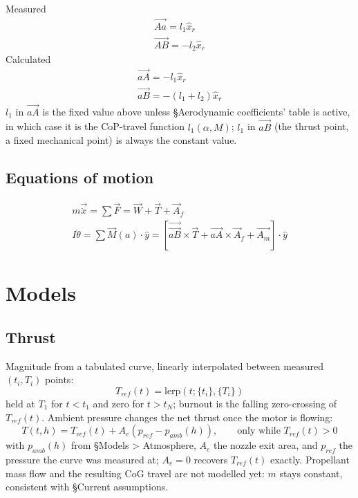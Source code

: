 \documentclass[10pt]{extarticle}
\numberwithin{equation}{subsubsection}
\begin{document}
Measured
\begin{gather}
    \vec{Aa} = l_1\hat{x}_r \\
    \vec{AB} = -l_2\hat{x}_r
\end{gather}
Calculated
\begin{gather}
    \vec{aA} = -l_1\hat{x}_r \\
    \vec{aB} = -(l_1 + l_2)\hat{x}_r
\end{gather}
$l_1$ in $\vec{aA}$ is the fixed value above unless \S Aerodynamic coefficients' table is active,
in which case it is the CoP-travel function $l_1(\alpha, M)$; $l_1$ in $\vec{aB}$ (the thrust
point, a fixed mechanical point) is always the constant value.
\subsection{Equations of motion}
\begin{gather}
    m\vec{\ddot{x}} = \sum \vec{F} = \vec{W} + \vec{T} + \vec{A}_f \\
    I\ddot{\theta} = \sum \vec{M}(a) \cdot \hat{y} = \left[\vec{\vec{aB}}\times\vec{T} + \vec{aA}\times\vec{A}_f + \vec{A_m}\right]\cdot \hat{y}
\end{gather}

\section{Models}
\subsection{Thrust}
Magnitude from a tabulated curve, linearly interpolated between measured $(t_i, T_i)$ points:
\begin{equation}
    T_{ref}(t) = \mathrm{lerp}\!\left(t; \{t_i\}, \{T_i\}\right)
\end{equation}
held at $T_1$ for $t < t_1$ and zero for $t > t_N$; burnout is the falling zero-crossing of
$T_{ref}(t)$. Ambient pressure changes the net thrust once the motor is flowing:
\begin{equation}
    T(t, h) = T_{ref}(t) + A_e\left(p_{ref} - p_{amb}(h)\right), \qquad \text{only while } T_{ref}(t) > 0
\end{equation}
with $p_{amb}(h)$ from \S Models > Atmosphere, $A_e$ the nozzle exit area, and $p_{ref}$ the
pressure the curve was measured at; $A_e = 0$ recovers $T_{ref}(t)$ exactly. Propellant mass flow
and the resulting CoG travel are not modelled yet: $m$ stays constant, consistent with
\S Current assumptions.
\end{document}

